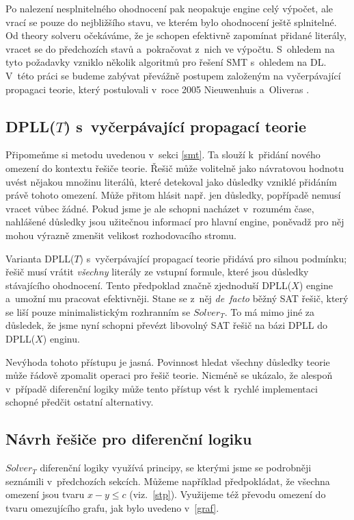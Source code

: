 Po nalezení nesplnitelného ohodnocení pak neopakuje engine celý výpočet, ale vrací se pouze do nejbližšího stavu, ve kterém bylo ohodnocení ještě splnitelné. Od theory solveru očekáváme, že je schopen efektivně zapomínat přidané literály, vracet se do předchozích stavů a~pokračovat z~nich ve výpočtu. %
S~ohledem na tyto požadavky vzniklo několik algoritmů pro řešení SMT s~ohledem na DL. V~této práci se budeme zabývat převážně postupem založeným na vyčerpávající propagaci teorie, který postulovali v~roce 2005 Nieuwenhuis a~Oliveras \cite{Nieuwenhuis05}.

\subsection{DPLL($T$) s~vyčerpávající propagací teorie}

Připomeňme si metodu  uvedenou v~sekci \ref{smt}. Ta slouží k~přidání nového omezení do kontextu řešiče teorie. Řešič může volitelně jako návratovou hodnotu uvést nějakou množinu literálů, které detekoval jako důsledky vzniklé přidáním právě tohoto omezení. Může přitom hlásit např. jen  důsledky, popřípadě nemusí vracet vůbec žádné. Pokud jsme je ale schopni nacházet v~rozumém čase, nahlášené důsledky jsou užitečnou informací pro hlavní engine, poněvadž pro něj mohou výrazně zmenšit velikost rozhodovacího stromu.

Varianta DPLL($T$) s~vyčerpávající propagací teorie přidává pro  silnou podmínku; řešič musí vrátit \emph{všechny} literály ze vstupní formule, které jsou důsledky stávajícího ohodnocení. Tento předpoklad značně zjednoduší DPLL($X$) engine a~umožní mu pracovat efektivněji. Stane se z~něj \emph{de~facto} běžný SAT řešič, který se liší pouze minimalistickým rozhranním se $Solver_T$. To má mimo jiné za důsledek, že jsme nyní schopni převézt libovolný SAT řešič na bázi DPLL do DPLL($X$) enginu.

Nevýhoda tohoto přístupu je jasná. Povinnost hledat všechny důsledky teorie může řádově zpomalit operaci  pro řešič teorie. Nicméně se ukázalo, že alespoň v~případě diferenční logiky může tento přístup vést k~rychlé implementaci schopné předčit ostatní alternativy.

\subsection{Návrh řešiče pro diferenční logiku}

$Solver_T$ diferenční logiky využívá principy, se kterými jsme se podrobněji seznámili v~předchozích sekcích. Můžeme například předpokládat, že všechna omezení jsou tvaru $x-y \leq c$ (viz.~\ref{stp}). Využijeme též převodu omezení do tvaru omezujícího grafu, jak bylo uvedeno v~\ref{graf}.

